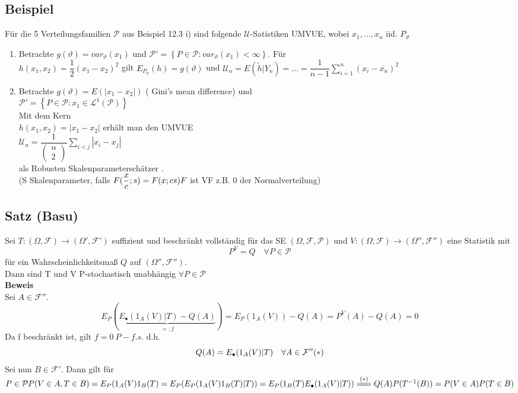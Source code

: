 \documentclass[german,10pt,oneside, fleqn, a4paper]{article}
\newcommand{\ra}{\rightarrow}
\newcommand{\sm}[2][\infty]{\sum\limits_{#2}^{#1}}
\newcommand{\brc}[1]{\left(#1\right)}
\newcommand{\brac}[1]{\left\lbrace #1\right\rbrace}
\newcommand{\mat}[1]{\begin{pmatrix}#1\end{pmatrix}}
\newcommand{\mc}[1]{\mathcal{#1}}
\newcommand{\lp}[1]{\mc{L}^{#1}}
\newcommand{\beweis}{\textbf{Beweis}\\}
\newcommand{\1}[1]{1_{#1}}
\newcommand{\2}[1]{\1{\brac{#1}}}
\newcommand{\rraum}{\brc{\Omega,\mc{F},\mc{P}}}
\newcommand{\f}{\mc{F}}
\newcommand{\p}{\mc{P}}
\newcommand{\uu}{\mc{U}}
\newcommand{\sumi}{\sm[n]{i=1}}
\newcommand{\qf}{\quad\forall}
\begin{document}
\begin{enumerate}[label=(\alph*)]
\begin{enumerate}[label=(\alph*)]
\subsection{Beispiel}
\label{12.7}
Für die 5 Verteilungsfamilien $\p$ aus Beispiel 12.3 i) sind folgende $\uu$-Satistiken UMVUE, wobei $x_1,...,x_n$ iid. $P_\vartheta$\begin{enumerate}[label=(\alph*)]
\item Betrachte $g(\vartheta)=var_\vartheta(x_1)$ und $\p'=\brac{P\in\p:var_\vartheta(x_1)<\infty}$. Für \\
$h(x_1,x_2)=\dfrac{1}{2}(x_1-x_2)^2$ gilt $E_{P_\vartheta}(h)=g(\vartheta)$ und $\uu_n=E(\tilde h|Y_n)=...=\dfrac{1}{n-1}\sumi (x_i-\overline{x_n})^2$
\item Betrachte $g(\vartheta)=E(|x_1-x_2|)$ ( Gini's mean difference) und\\
$\p'=\brac{P\in\p:x_1\in\lp{1}(\p)}$\\
Mit dem Kern \\
$h(x_1,x_2)=|x_1-x_2|$ erhält man den UMVUE\\
$\uu_n=\dfrac{1}{\mat{n\\2}}\sum\limits_{i<j}|x_i-x_j|$\\
als \glqq Robusten Skalenparameterschätzer \grqq.\\
(S Skalenparameter, falls $F(\dfrac{x}{c};s)=F(x;cs)\\
F$ ist VF z.B. 0 der Normalverteilung)
\end{enumerate}

\end{enumerate}
\end{enumerate}
\subsection{Satz (Basu)}
\label{12.8}
Sei $T:(\Omega,\f)\ra(\Omega',\f')$ suffizient und beschränkt vollständig für das SE $\rraum$ und $V:(\Omega,\f)\ra(\Omega'',\f'')$ eine Statistik mit \[
P^V=Q\qf P\in\p\]
für ein Wahrscheinlichkeitsmaß $Q$ auf $(\Omega'',\f'')$. \\
Dann sind T und V P-stochastisch unabhängig $\forall P \in\p$\\
\beweis 
Sei $A\in\f''$. \[
E_P(\underbrace{E_\bullet(1_A(V)|T)-Q(A)}_{=:f})=E_P(1_A(V))-Q(A)=P^V(A)-Q(A)=0\]
Da f beschränkt ist, gilt $f=0\ P-f.s.$ d.h. \[
Q(A)=E_\bullet(1_A(V)|T)\qf A\in\f''\hfill(*)\]
Sei nun $B\in\f'$. Dann gilt für $P\in\p\\
P(V\in A,T\in B)=E_P(1_A(V)1_B(T)=E_P(E_P(1_A(V)1_B(T)|T))=E_P(1_B(T)E_\bullet(1_A(V)|T))\xlongequal{(*)}Q(A)P(T^{-1}(B))=P(V\in A)P(T\in B)$\\
\end{document}
